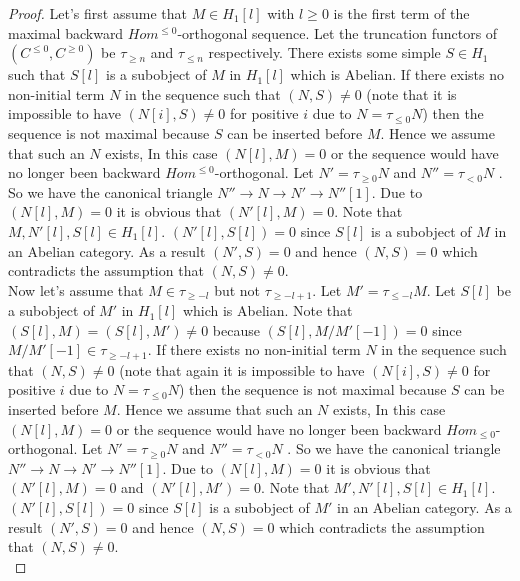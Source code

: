 \begin{proof}
\indent Let's first assume that $M\in H_1[l]$ with $l\geq 0$ is the first term of the maximal backward $Hom^{\leq 0}$-orthogonal sequence. Let the truncation functors of $(C^{\leq 0}, C^{\geq 0})$ be $\tau_{\geq n}$ and $\tau_{\leq n}$ respectively. There exists some simple $S\in H_1$ such that $S[l]$ is a subobject of $M$ in $H_1[l]$ which is Abelian. If there exists no non-initial term $N$ in the sequence such that $(N,S) \neq 0$ (note that it is impossible to have $(N[i],S)\neq 0$ for positive $i$ due to $N=\tau_{\leq 0}N$) then the sequence is not maximal because $S$ can be inserted before $M$. Hence we assume that such an $N$ exists, In this case $(N[l],M)= 0$ or the sequence would have no longer been backward $Hom^{\leq 0}$-orthogonal. Let $N' = \tau_{\geq 0}N$ and $N'' = \tau_{<0} N$ . So we have the canonical triangle $N''\to N\to N'\to N''[1]$. Due to $(N[l],M) = 0$ it is obvious that $(N'[l],M) = 0$. Note that $M, N'[l], S[l]\in H_1[l]$. $(N'[l],S[l]) = 0$ since $S[l]$ is a subobject of $M$ in an Abelian category. As a result $(N',S) = 0$ and hence $(N,S) = 0$ which contradicts the assumption that $(N,S)\neq 0$.\\
\indent Now let's assume that $M\in \tau_{\geq -l}$ but not $\tau_{\geq -l+1}$. Let $M' = \tau_{\leq -l}M$. Let $S[l]$ be a subobject of $M'$ in $H_1[l]$ which is Abelian. Note that $(S[l],M) = (S[l],M')\neq 0$ because $(S[l], M/M'[-1]) = 0$ since $M/M'[-1]\in \tau_{\geq -l+1}$. If there exists no non-initial term $N$ in the sequence such that $(N,S) \neq 0$ (note that again it is impossible to have $(N[i],S)\neq 0$ for positive $i$ due to $N=\tau_{\leq 0}N$) then the sequence is not maximal because $S$ can be inserted before $M$. Hence we assume that such an $N$ exists, In this case $(N[l],M)= 0$ or the sequence would have no longer been backward $Hom_{\leq 0}$-orthogonal. Let $N' = \tau_{\geq 0}N$ and $N'' = \tau_{<0} N$ . So we have the canonical triangle $N''\to N\to N'\to N''[1]$. Due to $(N[l],M) = 0$ it is obvious that $(N'[l],M) = 0$ and $(N'[l],M')=0$. Note that $M', N'[l], S[l]\in H_1[l]$. $(N'[l],S[l]) = 0$ since $S[l]$ is a subobject of $M'$ in an Abelian category. As a result $(N',S) = 0$ and hence $(N,S) = 0$ which contradicts the assumption that $(N,S)\neq 0$.\\
\end{proof}
